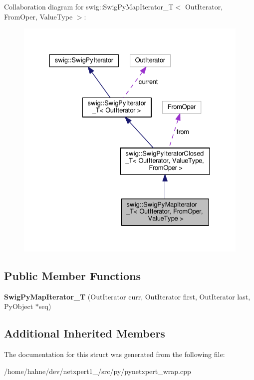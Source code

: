 Collaboration diagram for swig\+:\+:Swig\+Py\+Map\+Iterator\+\_\+T$<$ Out\+Iterator, From\+Oper, Value\+Type $>$\+:\nopagebreak
\begin{figure}[H]
\begin{center}
\leavevmode
\includegraphics[width=329pt]{structswig_1_1SwigPyMapIterator__T__coll__graph}
\end{center}
\end{figure}
\subsection*{Public Member Functions}
\begin{DoxyCompactItemize}
\item 
{\bfseries Swig\+Py\+Map\+Iterator\+\_\+T} (Out\+Iterator curr, Out\+Iterator first, Out\+Iterator last, Py\+Object $\ast$seq)\hypertarget{structswig_1_1SwigPyMapIterator__T_af93da33a7a2ad14b70e2ed9f1bcd7ea9}{}\label{structswig_1_1SwigPyMapIterator__T_af93da33a7a2ad14b70e2ed9f1bcd7ea9}

\end{DoxyCompactItemize}
\subsection*{Additional Inherited Members}


The documentation for this struct was generated from the following file\+:\begin{DoxyCompactItemize}
\item 
/home/hahne/dev/netxpert1\+\_/src/py/pynetxpert\+\_\+wrap.\+cpp\end{DoxyCompactItemize}
